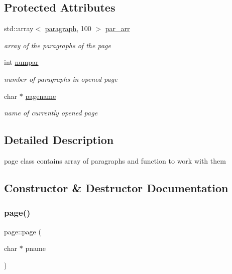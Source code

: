 \subsection*{Protected Attributes}
\begin{DoxyCompactItemize}
\item 
\mbox{\label{classpage_ac0fc49e219397088606ebdaa04e5728f}} 
std\+::array$<$ \hyperlink{classparagraph}{paragraph}, 100 $>$ \hyperlink{classpage_ac0fc49e219397088606ebdaa04e5728f}{par\+\_\+arr}
\begin{DoxyCompactList}\small\item\em array of the paragraphs of the page \end{DoxyCompactList}\item 
\mbox{\label{classpage_ac98ed4bbad67f1981e117ccc488cc1b7}} 
int \hyperlink{classpage_ac98ed4bbad67f1981e117ccc488cc1b7}{numpar}
\begin{DoxyCompactList}\small\item\em number of paragraphs in opened page \end{DoxyCompactList}\item 
\mbox{\label{classpage_a362475983bb94ce58bb55d49c2646ec9}} 
char $\ast$ \hyperlink{classpage_a362475983bb94ce58bb55d49c2646ec9}{pagename}
\begin{DoxyCompactList}\small\item\em name of currently opened page \end{DoxyCompactList}\end{DoxyCompactItemize}


\subsection{Detailed Description}
page class contains array of paragraphs and function to work with them 

\subsection{Constructor \& Destructor Documentation}
\mbox{\label{classpage_a70d21de949a1787fb6db224844b8dce9}} 
\subsubsection{\texorpdfstring{page()}{page()}}
{\footnotesize\ttfamily page\+::page (\begin{DoxyParamCaption}\item[{char $\ast$}]{pname }\end{DoxyParamCaption})\hspace{0.3cm}{\ttfamily [inline]}}

